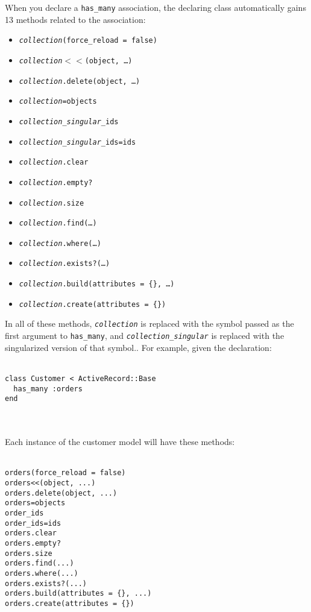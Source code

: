 \documentclass[10pt]{book}
\begin{document}
When you declare a \texttt{has\_many} association, the declaring class automatically gains 13 methods related to the association:
\begin{itemize}
	\item \texttt{\emph{collection}(force\_reload = false)}
	\item \texttt{\emph{collection}$<$$<$(object, …)}
	\item \texttt{\emph{collection}.delete(object, …)}
	\item \texttt{\emph{collection}=objects}
	\item \texttt{\emph{collection\_singular}\_ids}
	\item \texttt{\emph{collection\_singular}\_ids=ids}
	\item \texttt{\emph{collection}.clear}
	\item \texttt{\emph{collection}.empty?}
	\item \texttt{\emph{collection}.size}
	\item \texttt{\emph{collection}.find(…)}
	\item \texttt{\emph{collection}.where(…)}
	\item \texttt{\emph{collection}.exists?(…)}
	\item \texttt{\emph{collection}.build(attributes = \{\}, …)}
	\item \texttt{\emph{collection}.create(attributes = \{\})}
\end{itemize}

In all of these methods, \texttt{\emph{collection}} is replaced with the symbol passed as the first argument to \texttt{has\_many}, and \texttt{\emph{collection\_singular}} is replaced with the singularized version of that symbol.. For example, given the declaration:
\\ \\
\begin{minipage}{\textwidth}{\scriptsize
\begin{verbatim}
class Customer < ActiveRecord::Base
  has_many :orders
end
\end{verbatim}}
\end{minipage}
\\ \\

Each instance of the customer model will have these methods:
\\ \\
\begin{minipage}{\textwidth}{\scriptsize
\begin{verbatim}
orders(force_reload = false)
orders<<(object, ...)
orders.delete(object, ...)
orders=objects
order_ids
order_ids=ids
orders.clear
orders.empty?
orders.size
orders.find(...)
orders.where(...)
orders.exists?(...)
orders.build(attributes = {}, ...)
orders.create(attributes = {})
\end{verbatim}}
\end{minipage}
\\ \\
\end{document}
